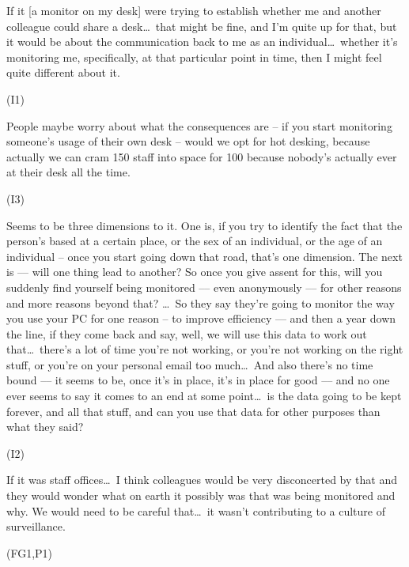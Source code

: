 \begin{qt}If it [a monitor on my desk] were trying to establish whether me and
another colleague could share a desk\ldots\  that might be fine, and I’m quite
up for that, but it would be about the communication back to me as an
individual\ldots\  whether it’s monitoring me, specifically, at that
particular point in time, then I might feel quite different about it.\end{qt} (I1)

\begin{qt}People maybe worry about what the
consequences are – if you start monitoring someone’s usage of their
own desk – would we opt
for hot desking, because actually we can cram 150 staff into space for
100 because nobody’s actually ever at their desk all the time.\end{qt} (I3)

\begin{qt}Seems to be three dimensions to it. One is, if you try to identify the fact that the person’s
based at a certain place, or the sex of an individual, or the age of
an individual – once you start going down that road, that’s one
dimension. The next is --– will one thing lead to another? So once you
give assent for this, will you suddenly find yourself being monitored
--– even anonymously --– for other reasons and more reasons beyond that? \ldots\  
So they say they’re going to monitor the way you use your PC for one
reason – to improve efficiency –-- and then a year down the line, if
they come back and say, well, we will use this data to work out
that\ldots\  there’s a lot of time you’re not working, or you’re not working
on the right stuff, or you’re on your personal email too much\ldots\  And also there’s no time bound --– it
seems to be, once it’s in place, it’s in place for good –-- and no one
ever seems to say it comes to an end at some point\ldots\  is the data going
to be kept forever, and all that stuff, and can you use that data for
other purposes than what they said?\end{qt} (I2)

\begin{qt}If it was staff offices\ldots\  I think colleagues would be
  very disconcerted by that and they would wonder what on earth it
  possibly was that was being monitored and why. We would need to be
  careful that\ldots\  it wasn’t contributing to a culture of
  surveillance.
\end{qt}
(FG1,P1)

